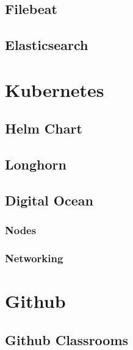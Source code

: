 \subsection{Filebeat}\label{subsec:filebeat}
\subsection{Elasticsearch}\label{subsec:elasticsearch}

\section{Kubernetes}\label{sec:kubernetes}
\subsection{Helm Chart}\label{subsec:helm-chart}
\subsection{Longhorn}\label{subsec:longhorn}
\subsection{Digital Ocean}\label{subsec:digital-ocean}
\subsubsection{Nodes}\label{subsubsec:digital-ocean-nodes}
\subsubsection{Networking}\label{subsubsec:digital-ocean-networking}

\section{Github}\label{sec:github}
\subsection{Github Classrooms}\label{subsec:github-classrooms}


